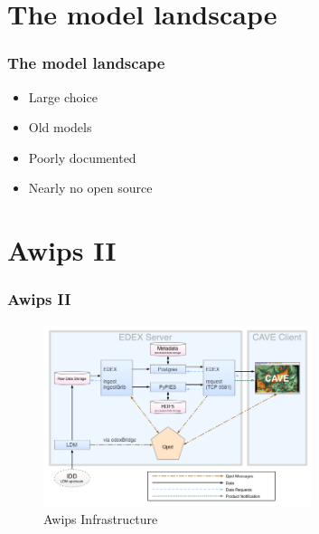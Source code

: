 \documentclass[compress]{beamer}
\begin{document}
\section{The model landscape}
\begin{frame}
    \frametitle{The model landscape}

		\begin{itemize}
		    \item Large choice
			\item Old models
			\item Poorly documented
			\item Nearly no open source
		\end{itemize}

\end{frame}

\section{Awips II}
\begin{frame}
    \frametitle{Awips II}
    \begin{center}
    	\begin{figure}
			\includegraphics[width=0.7\textwidth]{gfx/awipsII.png}
      	  	\caption[]{Awips Infrastructure \cite{Uni01}}
		\end{figure}
	\end{center}

\end{frame}
\end{document}
